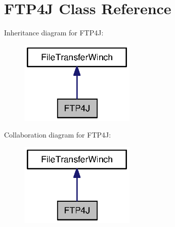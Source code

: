 \section{F\-T\-P4\-J Class Reference}
\label{classorg_1_1smallfoot_1_1filexfer_1_1FTP4J}


Inheritance diagram for F\-T\-P4\-J\-:\nopagebreak
\begin{figure}[H]
\begin{center}
\leavevmode
\includegraphics[width=156pt]{classorg_1_1smallfoot_1_1filexfer_1_1FTP4J__inherit__graph}
\end{center}
\end{figure}


Collaboration diagram for F\-T\-P4\-J\-:\nopagebreak
\begin{figure}[H]
\begin{center}
\leavevmode
\includegraphics[width=156pt]{classorg_1_1smallfoot_1_1filexfer_1_1FTP4J__coll__graph}
\end{center}
\end{figure}
